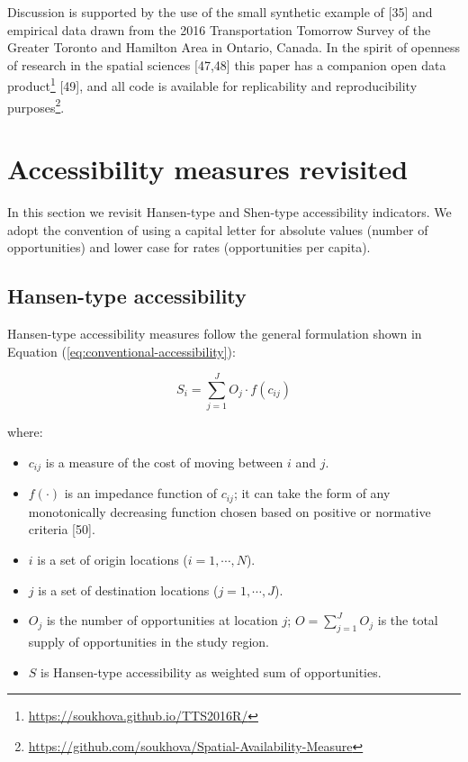 \documentclass[10pt,letterpaper]{article}
\providecommand{\tightlist}{%
  \setlength{\itemsep}{0pt}\setlength{\parskip}{0pt}}
\begin{document}
Discussion is supported by the use of the small synthetic example of
{[}35{]} and empirical data drawn from the 2016 Transportation Tomorrow
Survey of the Greater Toronto and Hamilton Area in Ontario, Canada. In
the spirit of openness of research in the spatial sciences {[}47,48{]}
this paper has a companion open data product\footnote{\url{https://soukhova.github.io/TTS2016R/}}
{[}49{]}, and all code is available for replicability and
reproducibility purposes\footnote{\url{https://github.com/soukhova/Spatial-Availability-Measure}}.

\hypertarget{background}{%
\section{Accessibility measures revisited}\label{background}}

In this section we revisit Hansen-type and Shen-type accessibility
indicators. We adopt the convention of using a capital letter for
absolute values (number of opportunities) and lower case for rates
(opportunities per capita).

\hypertarget{hansen-type-accessibility}{%
\subsection{Hansen-type accessibility}\label{hansen-type-accessibility}}

Hansen-type accessibility measures follow the general formulation shown
in Equation (\ref{eq:conventional-accessibility}):

\begin{equation}
\label{eq:conventional-accessibility}
S_i = \sum_{j=1}^JO_j \cdot f(c_{ij})
\end{equation}

\noindent where:

\begin{itemize}
\tightlist
\item
  \(c_{ij}\) is a measure of the cost of moving between \(i\) and \(j\).
\item
  \(f(\cdot)\) is an impedance function of \(c_{ij}\); it can take the
  form of any monotonically decreasing function chosen based on positive
  or normative criteria {[}50{]}.
\item
  \(i\) is a set of origin locations (\(i = 1,\cdots,N\)).
\item
  \(j\) is a set of destination locations (\(j = 1,\cdots,J\)).
\item
  \(O_j\) is the number of opportunities at location \(j\);
  \(O = \sum_{j=1}^J O_j\) is the total supply of opportunities in the
  study region.
\item
  \(S\) is Hansen-type accessibility as weighted sum of opportunities.
\end{itemize}
\end{document}
